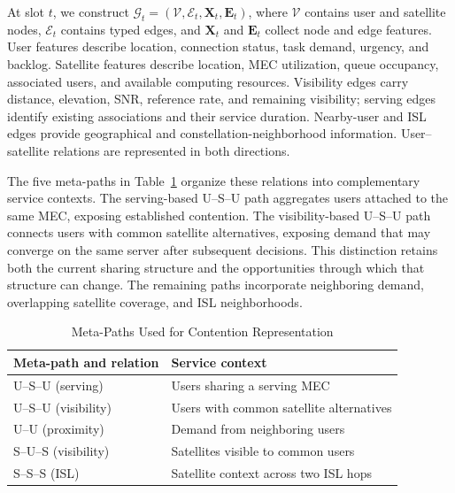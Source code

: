 \documentclass[journal]{IEEEtran}
\begin{document}
At slot $t$, we construct
$\mathcal{G}_t=(\mathcal{V},\mathcal{E}_t,\mathbf{X}_t,
\mathbf{E}_t)$, where $\mathcal{V}$ contains user and satellite
nodes, $\mathcal{E}_t$ contains typed edges, and
$\mathbf{X}_t$ and $\mathbf{E}_t$ collect node and edge
features. User features describe location, connection status,
task demand, urgency, and backlog. Satellite features describe
location, MEC utilization, queue occupancy, associated users,
and available computing resources. Visibility edges carry
distance, elevation, SNR, reference rate, and remaining
visibility; serving edges identify existing associations
and their service duration. Nearby-user and ISL edges provide
geographical and constellation-neighborhood information.
User--satellite relations are represented in both directions.

The five meta-paths in Table~\ref{tab:han_metapaths}
organize these relations into complementary service contexts.
The serving-based U--S--U path aggregates users attached to
the same MEC, exposing established contention. The
visibility-based U--S--U path connects users with common
satellite alternatives, exposing demand that may converge
on the same server after subsequent decisions. This
distinction retains both the current sharing structure and
the opportunities through which that structure can change.
The remaining paths incorporate neighboring demand,
overlapping satellite coverage, and ISL neighborhoods.

\begin{table}[H]
    \caption{Meta-Paths Used for Contention Representation}
    \label{tab:han_metapaths}
    \centering
    \footnotesize
    \renewcommand{\arraystretch}{1.13}
    \begin{tabular}{p{}p{}}
        \hline
        Meta-path and relation & Service context \\
        \hline
        U--S--U (serving) &
        Users sharing a serving MEC \\
        U--S--U (visibility) &
        Users with common satellite alternatives \\
        U--U (proximity) &
        Demand from neighboring users \\
        S--U--S (visibility) &
        Satellites visible to common users \\
        S--S--S (ISL) &
        Satellite context across two ISL hops \\
        \hline
    \end{tabular}
\end{table}
\end{document}
